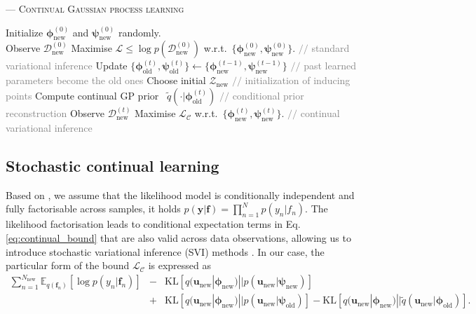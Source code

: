 \documentclass[]{article}
\def\u{{\mathbf u}}
\def\f{{\mathbf f}}
\newcommand{\psiold}{{\bm{\psi}_{\text{old}}}}
\newcommand{\psinew}{{\bm{\psi}_{\text{new}}}}
\newcommand{\unew}{{\u_{\text{new}}}}
\newcommand{\Zcal}{\mathcal{Z}}
\newcommand{\Dcal}{\mathcal{D}}
\newcommand{\Lcal}{\mathcal{L}}
\newcommand{\yc}{\bm{y}}
\newcommand{\phiold}{{\bm{\phi}_{\text{old}}}}
\newcommand{\phinew}{{\bm{\phi}_{\text{new}}}}
\begin{document}
\begin{algorithm}[]
	\caption{--- \textsc{Continual Gaussian process learning}}
	\label{alg:single}
	\begin{algorithmic}[1]
		\STATE Initialize $\bm{\phi}_\text{new}^{(0)}$ and $\bm{\psi}_\text{new}^{(0)}$ randomly.\\
		 Observe $\Dcal^{(0)}_\text{new}$ 
		\STATE	Maximise $\Lcal\leq\log p(\Dcal^{(0)}_\text{new})$ w.r.t.\ $\{\bm{\phi}_\text{new}^{(0)}, \bm{\psi}_\text{new}^{(0)}\}$. \hfill \textcolor{gray}{$//$ standard variational inference}
		\STATE	Update $\{\bm{\phi}_\text{old}^{(t)}, \bm{\psi}_\text{old}^{(t)}\} \leftarrow \{\bm{\phi}_\text{new}^{(t-1)}, \bm{\psi}_\text{new}^{(t-1)}\}$ \hfill \textcolor{gray}{$//$ past learned parameters become the old ones}
		\STATE Choose initial $\Zcal_\text{new}$ \hfill \textcolor{gray}{$//$ initialization of inducing points}
		\STATE Compute continual GP prior ~$\widetilde{q}(\cdot|\bm{\phi}_\text{old}^{(t)})$ \hfill \textcolor{gray}{$//$ conditional prior reconstruction}
		 Observe $\Dcal^{(t)}_\text{new}$ 
		\STATE	Maximise $\Lcal_\mathcal{C}$ w.r.t.\ $\{\bm{\phi}_\text{new}^{(t)}, \bm{\psi}_\text{new}^{(t)}\}$. \hfill  \textcolor{gray}{$//$ continual variational inference}
		\ENDFOR
	\end{algorithmic}
\end{algorithm}


\subsection{Stochastic continual learning}

Based on \citet{hensman2013gaussian}, we assume that the likelihood model is conditionally independent and fully factorisable across samples,  it holds $p(\yc|\f) = \prod_{n=1}^{N}p(y_n|f_n)$. The likelihood factorisation leads to conditional expectation terms in Eq. \eqref{eq:continual_bound} that are also valid across data observations, allowing us to introduce stochastic variational inference (SVI) methods \citep{hoffman2013stochastic}. In our case, the particular form of the bound $\Lcal_{\mathcal{C}}$ is expressed as
\begin{eqnarray}
\label{eq:stochastic_bound}
\sum_{n=1}^{N_\text{new}}\mathbb{E}_{q(\f_n)} [\log p(y_n|\f_n)] &-& \text{KL}[q(\unew|\phinew)||p(\unew|\psinew)] \nonumber\\&+& 
 \text{KL}[q(\unew|\phinew)||p(\unew|\psiold)] - \text{KL}[q(\unew|\phinew)||\widetilde{q}(\unew|\phiold)].
\end{eqnarray}
\end{document}
